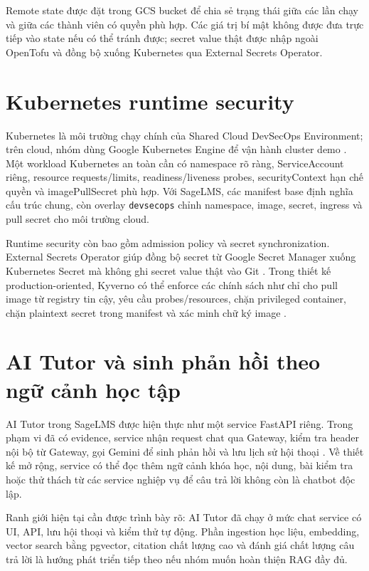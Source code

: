 Remote state được đặt trong GCS bucket để chia sẻ trạng thái giữa các lần chạy và giữa các thành viên có quyền phù hợp. Các giá trị bí mật không được đưa trực tiếp vào state nếu có thể tránh được; secret value thật được nhập ngoài OpenTofu và đồng bộ xuống Kubernetes qua External Secrets Operator.

\section{Kubernetes runtime security}

Kubernetes là môi trường chạy chính của Shared Cloud DevSecOps Environment; trên cloud, nhóm dùng Google Kubernetes Engine để vận hành cluster demo \cite{kubernetes,gkeDocs}. Một workload Kubernetes an toàn cần có namespace rõ ràng, ServiceAccount riêng, resource requests/limits, readiness/liveness probes, securityContext hạn chế quyền và imagePullSecret phù hợp. Với SageLMS, các manifest base định nghĩa cấu trúc chung, còn overlay \texttt{devsecops} chỉnh namespace, image, secret, ingress và pull secret cho môi trường cloud.

Runtime security còn bao gồm admission policy và secret synchronization. External Secrets Operator giúp đồng bộ secret từ Google Secret Manager xuống Kubernetes Secret mà không ghi secret value thật vào Git \cite{externalSecrets}. Trong thiết kế production-oriented, Kyverno có thể enforce các chính sách như chỉ cho pull image từ registry tin cậy, yêu cầu probes/resources, chặn privileged container, chặn plaintext secret trong manifest và xác minh chữ ký image \cite{kyvernoDocs}.

\section{AI Tutor và sinh phản hồi theo ngữ cảnh học tập}

AI Tutor trong SageLMS được hiện thực như một service FastAPI riêng. Trong phạm vi đã có evidence, service nhận request chat qua Gateway, kiểm tra header nội bộ từ Gateway, gọi Gemini để sinh phản hồi và lưu lịch sử hội thoại \cite{googleGeminiApi,langchainDocs}. Về thiết kế mở rộng, service có thể đọc thêm ngữ cảnh khóa học, nội dung, bài kiểm tra hoặc thử thách từ các service nghiệp vụ để câu trả lời không còn là chatbot độc lập.

Ranh giới hiện tại cần được trình bày rõ: AI Tutor đã chạy ở mức chat service có UI, API, lưu hội thoại và kiểm thử tự động. Phần ingestion học liệu, embedding, vector search bằng pgvector, citation chất lượng cao và đánh giá chất lượng câu trả lời là hướng phát triển tiếp theo nếu nhóm muốn hoàn thiện RAG đầy đủ.

